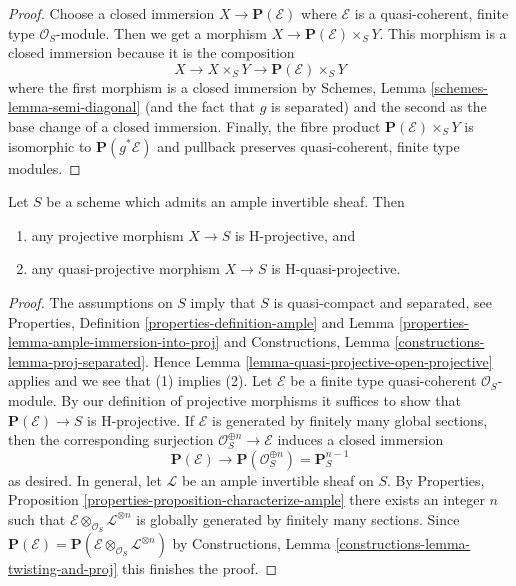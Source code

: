 \begin{proof}
Choose a closed immersion $X \to \mathbf{P}(\mathcal{E})$ where $\mathcal{E}$
is a quasi-coherent, finite type $\mathcal{O}_S$-module. Then
we get a morphism $X \to \mathbf{P}(\mathcal{E}) \times_S Y$.
This morphism is a closed immersion because it is the composition
$$
X \to X \times_S Y \to \mathbf{P}(\mathcal{E}) \times_S Y
$$
where the first morphism is a closed immersion by
Schemes, Lemma \ref{schemes-lemma-semi-diagonal}
(and the fact that $g$ is separated) and
the second as the base change of a closed immersion.
Finally, the fibre product $\mathbf{P}(\mathcal{E}) \times_S Y$
is isomorphic to $\mathbf{P}(g^*\mathcal{E})$ and pullback
preserves quasi-coherent, finite type modules.
\end{proof}

\begin{lemma}
\label{lemma-projective-over-quasi-projective-is-H-projective}
Let $S$ be a scheme which admits an ample invertible sheaf. Then
\begin{enumerate}
\item any projective morphism $X \to S$ is H-projective, and
\item any quasi-projective morphism $X \to S$ is H-quasi-projective.
\end{enumerate}
\end{lemma}

\begin{proof}
The assumptions on $S$ imply that $S$ is quasi-compact and separated, see
Properties, Definition \ref{properties-definition-ample} and
Lemma \ref{properties-lemma-ample-immersion-into-proj}
and Constructions, Lemma \ref{constructions-lemma-proj-separated}.
Hence Lemma \ref{lemma-quasi-projective-open-projective}
applies and we see that (1) implies (2).
Let $\mathcal{E}$ be a finite type quasi-coherent $\mathcal{O}_S$-module.
By our definition of projective morphisms it suffices to show that
$\mathbf{P}(\mathcal{E}) \to S$ is H-projective.
If $\mathcal{E}$ is generated by finitely many global sections,
then the corresponding surjection $\mathcal{O}_S^{\oplus n} \to \mathcal{E}$
induces a closed immersion
$$
\mathbf{P}(\mathcal{E}) \longrightarrow
\mathbf{P}(\mathcal{O}_S^{\oplus n}) = \mathbf{P}^{n - 1}_S
$$
as desired. In general, let $\mathcal{L}$ be an ample invertible sheaf on $S$.
By Properties, Proposition \ref{properties-proposition-characterize-ample}
there exists an integer $n$ such that
$\mathcal{E} \otimes_{\mathcal{O}_S} \mathcal{L}^{\otimes n}$
is globally generated by finitely many sections. Since
$\mathbf{P}(\mathcal{E}) =
\mathbf{P}(\mathcal{E} \otimes_{\mathcal{O}_S} \mathcal{L}^{\otimes n})$ by
Constructions, Lemma \ref{constructions-lemma-twisting-and-proj}
this finishes the proof.
\end{proof}

